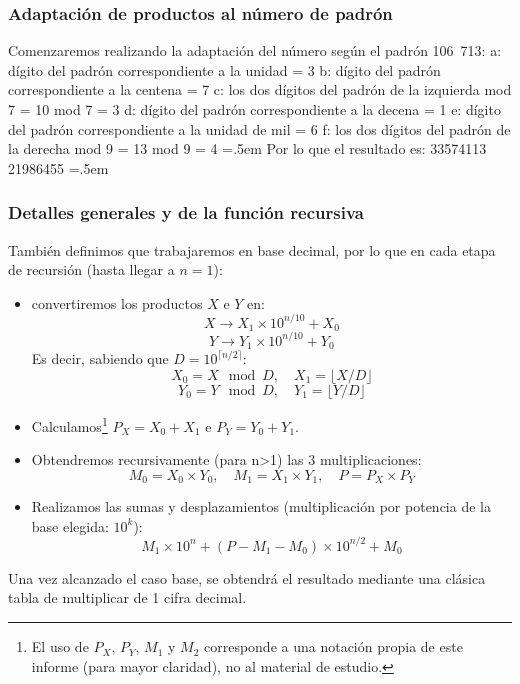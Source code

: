 \documentclass[titlepage,a4paper]{article}
\newenvironment{lcverbatim}
 {\SaveVerbatim{cverb}}
 {\endSaveVerbatim
  \flushleft\fboxrule=0pt\fboxsep=.5em
  \colorbox{cverbbg}{%
    \makebox[\dimexpr\linewidth-2\fboxsep][l]{\BUseVerbatim{cverb}}%
  }
  \endflushleft
}
\begin{document}
\subsubsection{Adaptación de productos al número de padrón}
Comenzaremos realizando la adaptación del número según el padrón 106~713:
\begin{lcverbatim}
    a: dígito del padrón correspondiente a la unidad = 3
    b: dígito del padrón correspondiente a la centena = 7
    c: los dos dígitos del padrón de la izquierda mod 7 = 10 mod 7 = 3
    d: dígito del padrón correspondiente a la decena = 1
    e: dígito del padrón correspondiente a la unidad de mil = 6
    f: los dos dígitos del padrón de la derecha mod 9 = 13 mod 9 = 4
\end{lcverbatim}
Por lo que el resultado es:
\begin{lcverbatim}
    33574113 
    21986455
\end{lcverbatim}
\subsubsection{Detalles generales y  de la función recursiva}
También definimos que trabajaremos en base decimal, por lo que en cada etapa de recursión (hasta llegar a $n=1$):
\begin{itemize}
    \item convertiremos los productos $X$ e $Y$ en:
    $$X \rightarrow X_1\times 10^{n/10}+X_0$$
    $$Y \rightarrow Y_1\times 10^{n/10}+Y_0$$
    Es decir, sabiendo que $D = 10^{\lceil n/2\rceil}$:
    $$X_0 = X \mod D, \quad X_1 = \lfloor X / D \rfloor$$
    $$Y_0 = Y \mod D, \quad Y_1 = \lfloor Y / D \rfloor$$
    \item Calculamos\footnote{El uso de $P_X$, $P_Y$, $M_1$ y $M_2$ corresponde a una notación propia de este informe (para mayor claridad), no al material de estudio.} $P_X=X_0+X_1$ e $P_Y=Y_0+Y_1$.
    \item Obtendremos recursivamente (para n>1) las 3 multiplicaciones\footnotemark[\value{footnote}]:
    $$M_0 = X_0\times Y_0,\quad M_1 = X_1\times Y_1,\quad P = P_X\times P_Y$$
    \item Realizamos las sumas y desplazamientos (multiplicación por potencia de la base elegida: $10^k$):
    $$M_1\times 10^n + (P-M_1-M_0)\times 10^{n/2} + M_0$$
\end{itemize}

Una vez alcanzado el caso base, se obtendrá el resultado mediante una clásica tabla de multiplicar de 1 cifra decimal.
\end{document}
